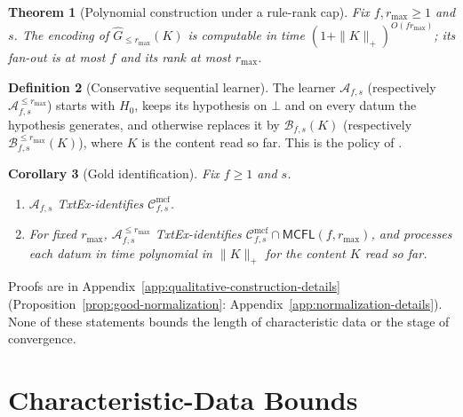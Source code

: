 \documentclass[11pt]{article}
\numberwithin{equation}{section}
\theoremstyle{plain}
\newtheorem{theorem}{Theorem}[section]
\newtheorem{corollary}[theorem]{Corollary}
\theoremstyle{definition}
\newtheorem{definition}[theorem]{Definition}
\theoremstyle{remark}
\newcommand{\Cmcf}[2]{\mathcal{C}^{\mathrm{mcf}}_{#1,#2}}
\newcommand{\pausesym}{\bot}
\begin{document}
\begin{theorem}[Polynomial construction under a rule-rank cap]
\label{thm:poly}
Fix $f,r_{\max}\ge1$ and $s$.  The encoding of $\widehat G_{\le r_{\max}}(K)$ is
computable in time $(1+\|K\|_+)^{O(fr_{\max})}$; its fan-out is at most $f$
and its rank at most $r_{\max}$.
\end{theorem}

\begin{definition}[Conservative sequential learner]
\label{def:conservative-learner}
The learner $\mathcal A_{f,s}$ (respectively $\mathcal A_{f,s}^{\le r_{\max}}$)
starts with $H_0$, keeps its hypothesis on $\pausesym$ and on every datum the
hypothesis generates, and otherwise replaces it by $\mathcal B_{f,s}(K)$
(respectively $\mathcal B_{f,s}^{\le r_{\max}}(K)$), where $K$ is the content
read so far.  This is the policy of \cite[Algorithm~1]{Yoshinaka2011}.
\end{definition}

\begin{corollary}[Gold identification]
\label{cor:gold-explanatory}
\label{cor:capped-gold-poly}
Fix $f\ge1$ and $s$.
\begin{enumerate}[label=\textup{(\roman*)}]
\item $\mathcal A_{f,s}$ TxtEx-identifies $\Cmcf{f}{s}$.
\item For fixed $r_{\max}$, $\mathcal A_{f,s}^{\le r_{\max}}$ TxtEx-identifies
$\Cmcf{f}{s}\cap\mathsf{MCFL}(f,r_{\max})$, and processes each datum in time
polynomial in $\|K\|_+$ for the content $K$ read so far.
\end{enumerate}
\end{corollary}

Proofs are in Appendix~\ref{app:qualitative-construction-details}
(Proposition~\ref{prop:good-normalization}: Appendix~\ref{app:normalization-details}).
None of these statements bounds the length of characteristic data or the
stage of convergence.

\section{Characteristic-Data Bounds}
\label{sec:char-data}
\end{document}
